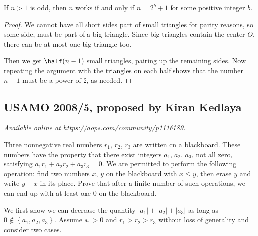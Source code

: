 \documentclass[11pt]{scrartcl}
\begin{document}
\begin{claim*}
  If $n > 1$ is odd, then $n$ works if and only if $n = 2^b+1$
  for some positive integer $b$.
\end{claim*}
\begin{proof}
  We cannot have all short sides part of small triangles
  for parity reasons, so some side, must be part of a big triangle.
  Since big triangles contain the center $O$,
  there can be at most one big triangle too.

  Then we get $\half(n-1)$ small triangles,
  pairing up the remaining sides.
  Now repeating the argument with the triangles on each half
  shows that the number $n-1$ must be a power of $2$, as needed.
\end{proof}
\pagebreak

\subsection{USAMO 2008/5, proposed by Kiran Kedlaya}
\textsl{Available online at \url{https://aops.com/community/p1116189}.}
\begin{mdframed}[style=mdpurplebox,frametitle={Problem statement}]
Three nonnegative real numbers $r_1$, $r_2$, $r_3$
are written on a blackboard.
These numbers have the property
that there exist integers $a_1$, $a_2$, $a_3$, not all zero,
satisfying $a_1r_1 + a_2r_2 + a_3r_3 = 0$.
We are permitted to perform the following operation:
find two numbers $x$, $y$ on the blackboard with $x \le y$,
then erase $y$ and write $y - x$ in its place.
Prove that after a finite number of such operations,
we can end up with at least one $0$ on the blackboard.
\end{mdframed}
We first show we can decrease the quantity
$\left\lvert a_1 \right\rvert + \left\lvert a_2 \right\rvert + \left\lvert a_3 \right\rvert$
as long as $0 \notin \left\{ a_1,a_2,a_3 \right\}$.
Assume $a_1 > 0$ and $r_1 > r_2 > r_3$
without loss of generality and consider two cases.
\end{document}
